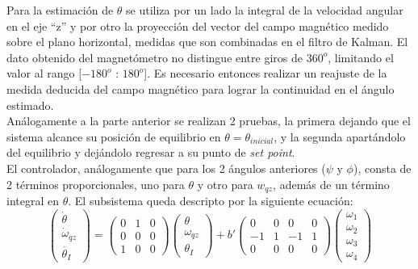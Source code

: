 \documentclass[main]{subfiles}
\begin{document}
Para la estimaci\'on de $\theta$ se utiliza por un lado la integral de la velocidad angular en el eje ``z'' y por otro la proyecci\'on del vector del campo magn\'etico medido sobre el plano horizontal, medidas que son combinadas en el filtro de Kalman. El dato obtenido del magnet\'ometro no distingue entre giros de $360^o$, limitando el valor al rango [$-180^o$ : $180^o$]. Es necesario entonces realizar un reajuste de la medida deducida del campo magn\'etico para lograr la continuidad en el \'angulo estimado.\\

Análogamente a la parte anterior se realizan 2 pruebas, la primera dejando que el sistema alcance su posición de equilibrio en $\theta = \theta_{inicial}$, y la segunda apartándolo del equilibrio y dejándolo regresar a su punto de \emph{set point}.\\

El controlador, análogamente que para los 2 ángulos anteriores ($\psi$ y $\phi$), consta de 2 términos proporcionales, uno para $\theta$ y otro para $w_{qz}$, además de un término integral en $\theta$. El subsistema queda descripto por la siguiente ecuación:
\begin{equation}
\left(\begin{array}{c}
\dot{\theta}\\
\dot{\omega}_{qz}\\
\dot{\theta_I}
\end{array}\right) = 
\left(\begin{array}{ccc}
0 & 1 & 0\\
0 & 0 & 0\\
1 & 0 & 0
\end{array}\right) 
\left(\begin{array}{c}
{\theta}\\
{\omega}_{qz}\\
{\theta_I}
\end{array}\right)
+ b\prime \left(\begin{array}{cccc}
0  & 0 &  0 & 0 \\
-1 & 1 & -1 & 1 \\
0  & 0 &  0 & 0
\end{array}\right) \left(\begin{array}{c}
\omega_1 \\
\omega_2 \\
\omega_3 \\
\omega_4
\end{array}\right)
\end{equation}
\end{document}

